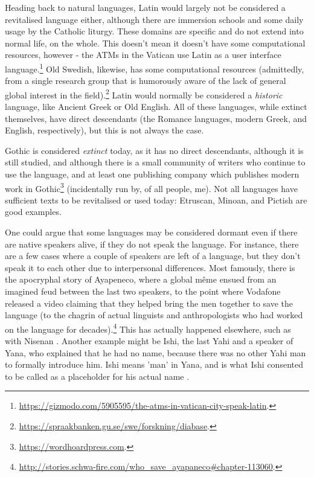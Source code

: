 Heading back to natural languages, Latin would largely not be considered a revitalised language either, although there are immersion schools and some daily usage by the Catholic liturgy. These domains are specific and do not extend into normal life, on the whole. This doesn't mean it doesn't have some computational resources, however - the ATMs in the Vatican use Latin as a user interface language.\footnote{\href{https://gizmodo.com/5905595/the-atms-in-vatican-city-speak-latin}{https://gizmodo.com/5905595/the-atms-in-vatican-city-speak-latin}. } Old Swedish, likewise, has some computational resources (admittedly, from a single research group that is humorously aware of the lack of general global interest in the field).\footnote{\href{https://spraakbanken.gu.se/swe/forskning/diabase}{https://spraakbanken.gu.se/swe/forskning/diabase}. } Latin would normally be considered a \textit{historic} language, like Ancient Greek or Old English. All of these languages, while extinct themselves, have direct descendants (the Romance languages, modern Greek, and English, respectively), but this is not always the case.

Gothic is considered \textit{extinct} today, as it has no direct descendants, although it is still studied, and although there is a small community of writers who continue to use the language, and at least one publishing company which publishes modern work in Gothic\footnote{\href{https://wordhoardpress.com}{https://wordhoardpress.com}. } (incidentally run by, of all people, me). Not all languages have sufficient texts to be revitalised or used today: Etruscan, Minoan, and Pictish are good examples.

One could argue that some languages may be considered dormant even if there are native speakers alive, if they do not speak the language. For instance, there are a few cases where a couple of speakers are left of a language, but they don't speak it to each other due to interpersonal differences. Most famously, there is the apocryphal story of Ayapeneco, where a global m\^eme ensued from an imagined feud between the last two speakers, to the point where Vodafone released a video claiming that they helped bring the men together to save the language (to the chagrin of actual linguists and anthropologists who had worked on the language for decades).\footnote{\href{http://stories.schwa-fire.com/who\_save\_ayapaneco\#chapter-113060}{http://stories.schwa-fire.com/who\_save\_ayapaneco\#chapter-113060}. } This has actually happened elsewhere, such as with Nisenan \citep{snyder2004practice}. Another example might be Ishi, the last Yahi and a speaker of Yana, who explained that he had no name, because there was no other Yahi man to formally introduce him. Ishi means 'man' in Yana, and is what Ishi consented to be called as a placeholder for his actual name \citep{kroeber1973ishi}.

